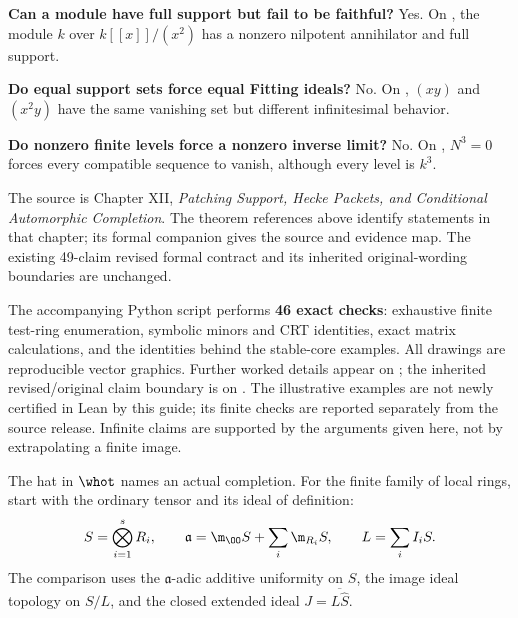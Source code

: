 \textbf{Can a module have full support but fail to be faithful?} Yes. On , the module $k$ over $k[[x]]/(x^2)$ has a nonzero nilpotent annihilator and full support.

\textbf{Do equal support sets force equal Fitting ideals?} No. On , $(xy)$ and $(x^2y)$ have the same vanishing set but different infinitesimal behavior.

\textbf{Do nonzero finite levels force a nonzero inverse limit?} No. On , $N^3=0$ forces every compatible sequence to vanish, although every level is $k^3$.

The source is Chapter XII, \emph{Patching Support, Hecke Packets, and Conditional Automorphic Completion}. The theorem references above identify statements in that chapter; its formal companion gives the source and evidence map. The existing 49-claim revised formal contract and its inherited original-wording boundaries are unchanged.

The accompanying Python script performs \textbf{46 exact checks}: exhaustive finite test-ring enumeration, symbolic minors and CRT identities, exact matrix calculations, and the identities behind the stable-core examples. All drawings are reproducible vector graphics. Further worked details appear on ; the inherited revised/original claim boundary is on . The illustrative examples are not newly certified in Lean by this guide; its finite checks are reported separately from the source release. Infinite claims are supported by the arguments given here, not by extrapolating a finite image.

\setlength{\parskip}{5pt}
The hat in $\whot$ names an actual completion. For the finite family of local rings, start with the ordinary tensor and its ideal of definition:
\[
 S=\bigotimes_{i=1}^s R_i,\qquad
 \mathfrak a=\m_{\OO}S+\sum_i\m_{R_i}S,\qquad L=\sum_i I_iS.
\]
The comparison uses the $\mathfrak a$-adic additive uniformity on $S$, the image ideal topology on $S/L$, and the closed extended ideal $J=\overline{L\widehat S}$.


